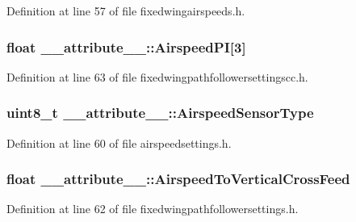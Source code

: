 \-Definition at line 57 of file fixedwingairspeeds.\-h.

\hypertarget{struct____attribute_____ad0d7b81282897792e9782594fa3d8179}{
\subsubsection[{\-Airspeed\-P\-I}]{\setlength{\rightskip}{0pt plus 5cm}float {\bf \-\_\-\-\_\-attribute\-\_\-\-\_\-\-::\-Airspeed\-P\-I}\mbox{[}3\mbox{]}}}\label{struct____attribute_____ad0d7b81282897792e9782594fa3d8179}


\-Definition at line 63 of file fixedwingpathfollowersettingscc.\-h.

\hypertarget{struct____attribute_____a67ecc64c4ed5b91a9d60eb3a3e7eb8a0}{
\subsubsection[{\-Airspeed\-Sensor\-Type}]{\setlength{\rightskip}{0pt plus 5cm}uint8\-\_\-t {\bf \-\_\-\-\_\-attribute\-\_\-\-\_\-\-::\-Airspeed\-Sensor\-Type}}}\label{struct____attribute_____a67ecc64c4ed5b91a9d60eb3a3e7eb8a0}


\-Definition at line 60 of file airspeedsettings.\-h.

\hypertarget{struct____attribute_____a1ac0e03d68cdb25e8836c96d77b2bd61}{
\subsubsection[{\-Airspeed\-To\-Vertical\-Cross\-Feed}]{\setlength{\rightskip}{0pt plus 5cm}float {\bf \-\_\-\-\_\-attribute\-\_\-\-\_\-\-::\-Airspeed\-To\-Vertical\-Cross\-Feed}}}\label{struct____attribute_____a1ac0e03d68cdb25e8836c96d77b2bd61}


\-Definition at line 62 of file fixedwingpathfollowersettings.\-h.

